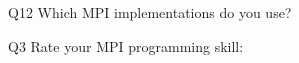 \begin{description}%
\item{Q12} Which MPI implementations do you use?%
\item{Q3} Rate your MPI programming skill:%
\end{description}%
